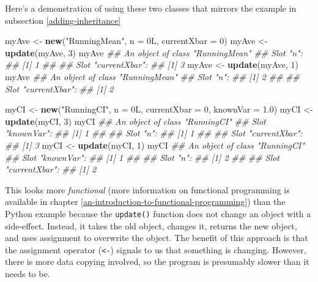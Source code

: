 \documentclass[12pt,krantz2]{krantz}
\makeatletter
\newenvironment{Shaded}{\begin{snugshade}}{\end{snugshade}}
\newcommand{\CommentTok}[1]{\textcolor[rgb]{0.37,0.37,0.37}{\textit{#1}}}
\newcommand{\DataTypeTok}[1]{\textcolor[rgb]{0.27,0.27,0.27}{#1}}
\newcommand{\DecValTok}[1]{\textcolor[rgb]{0.06,0.06,0.06}{#1}}
\newcommand{\FloatTok}[1]{\textcolor[rgb]{0.06,0.06,0.06}{#1}}
\newcommand{\KeywordTok}[1]{\textcolor[rgb]{0.27,0.27,0.27}{\textbf{#1}}}
\newcommand{\NormalTok}[1]{#1}
\newcommand{\StringTok}[1]{\textcolor[rgb]{0.5,0.5,0.5}{#1}}
\newenvironment{kframe}{%
\medskip{}
\setlength{\fboxsep}{.8em}
 \def\at@end@of@kframe{}%
 \ifinner\ifhmode%
  \def\at@end@of@kframe{\end{minipage}}%
  \begin{minipage}{\columnwidth}%
 \fi\fi%
 \def\FrameCommand##1{\hskip\@totalleftmargin \hskip-\fboxsep
 \colorbox{shadecolor}{##1}\hskip-\fboxsep
     \hskip-\linewidth \hskip-\@totalleftmargin \hskip\columnwidth}%
 \MakeFramed {\advance\hsize-\width
   \@totalleftmargin\z@ \linewidth\hsize
   \@setminipage}}%
 {\par\unskip\endMakeFramed%
 \at@end@of@kframe}
\renewenvironment{Shaded}{\begin{kframe}}{\end{kframe}}
\makeatother
\begin{document}
Here's a demonstration of using these two classes that mirrors the example in subsection \ref{adding-inheritance}

\begin{Shaded}
\begin{Highlighting}[]
\NormalTok{myAve <-}\StringTok{ }\KeywordTok{new}\NormalTok{(}\StringTok{"RunningMean"}\NormalTok{, }\DataTypeTok{n =}\NormalTok{ 0L, }\DataTypeTok{currentXbar =} \DecValTok{0}\NormalTok{)}
\NormalTok{myAve <-}\StringTok{ }\KeywordTok{update}\NormalTok{(myAve, }\DecValTok{3}\NormalTok{)}
\NormalTok{myAve}
\CommentTok{## An object of class "RunningMean"}
\CommentTok{## Slot "n":}
\CommentTok{## [1] 1}
\CommentTok{## }
\CommentTok{## Slot "currentXbar":}
\CommentTok{## [1] 3}
\NormalTok{myAve <-}\StringTok{ }\KeywordTok{update}\NormalTok{(myAve, }\DecValTok{1}\NormalTok{)}
\NormalTok{myAve}
\CommentTok{## An object of class "RunningMean"}
\CommentTok{## Slot "n":}
\CommentTok{## [1] 2}
\CommentTok{## }
\CommentTok{## Slot "currentXbar":}
\CommentTok{## [1] 2}

\NormalTok{myCI <-}\StringTok{ }\KeywordTok{new}\NormalTok{(}\StringTok{"RunningCI"}\NormalTok{, }\DataTypeTok{n =}\NormalTok{ 0L, }\DataTypeTok{currentXbar =} \DecValTok{0}\NormalTok{, }\DataTypeTok{knownVar =} \FloatTok{1.0}\NormalTok{)}
\NormalTok{myCI <-}\StringTok{ }\KeywordTok{update}\NormalTok{(myCI, }\DecValTok{3}\NormalTok{)}
\NormalTok{myCI}
\CommentTok{## An object of class "RunningCI"}
\CommentTok{## Slot "knownVar":}
\CommentTok{## [1] 1}
\CommentTok{## }
\CommentTok{## Slot "n":}
\CommentTok{## [1] 1}
\CommentTok{## }
\CommentTok{## Slot "currentXbar":}
\CommentTok{## [1] 3}
\NormalTok{myCI <-}\StringTok{ }\KeywordTok{update}\NormalTok{(myCI, }\DecValTok{1}\NormalTok{)}
\NormalTok{myCI}
\CommentTok{## An object of class "RunningCI"}
\CommentTok{## Slot "knownVar":}
\CommentTok{## [1] 1}
\CommentTok{## }
\CommentTok{## Slot "n":}
\CommentTok{## [1] 2}
\CommentTok{## }
\CommentTok{## Slot "currentXbar":}
\CommentTok{## [1] 2}
\end{Highlighting}
\end{Shaded}

This looks more \emph{functional} (more information on functional programming is available in chapter \ref{an-introduction-to-functional-programming}) than the Python example because the \texttt{update()} function does not change an object with a side-effect. Instead, it takes the old object, changes it, returns the new object, and uses assignment to overwrite the object. The benefit of this approach is that the assignment operator (\texttt{\textless{}-})  signals to us that something is changing. However, there is more data copying involved, so the program is presumably slower than it needs to be.
\end{document}
